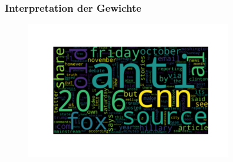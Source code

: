 \documentclass[aspectratio=1610, professionalfonts, 9pt]{beamer}
\begin{document}
  \begin{frame}
    \frametitle{Interpretation der Gewichte}
    \begin{figure}
          \includegraphics[width=0.8\textwidth]{pictures/bow/weights_wordcloud.pdf}
          \caption{}
          \label{}
      \end{figure}
  \end{frame}
\end{document}
